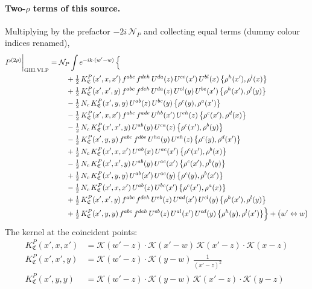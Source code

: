 \documentclass[10pt]{article}
\numberwithin{equation}{section}
\newcommand{\KK}{\mathcal K}
\newcommand{\NP}{\mathcal N_{P}}
\begin{document}
\paragraph{Two-$\rho$ terms of this source.} Multiplying by the prefactor $-2i\,\NP$ and collecting equal terms (dummy colour indices renamed),
\begin{align}
P^{(2\rho)}\bigg|_{\rm GIII.VI.P}={}&\NP\int e^{-ik\cdot(w'-w)}\,\Big\{\notag\\
&\quad +\tfrac12\,K^{P}_{\mathfrak C}(x',x,x')\,f^{abc}\,f^{deh}\,U^{da}(z)\,U^{ce}(x')\,U^{bl}(x)\,\big\{\rho^{h}(x'),\rho^{l}(x)\big\}\notag\\
&\quad +\tfrac12\,K^{P}_{\mathfrak C}(x',x',y)\,f^{abc}\,f^{deh}\,U^{da}(z)\,U^{cl}(y)\,U^{be}(x')\,\big\{\rho^{h}(x'),\rho^{l}(y)\big\}\notag\\
&\quad -\tfrac12\,N_{c}\,K^{P}_{\mathfrak C}(x',y,y)\,U^{ab}(z)\,U^{bc}(y)\,\big\{\rho^{c}(y),\rho^{a}(x')\big\}\notag\\
&\quad -\tfrac12\,K^{P}_{\mathfrak C}(x',x,x')\,f^{abc}\,f^{ade}\,U^{hb}(x')\,U^{eh}(z)\,\big\{\rho^{c}(x'),\rho^{d}(x)\big\}\notag\\
&\quad -\tfrac12\,N_{c}\,K^{P}_{\mathfrak C}(x',x',y)\,U^{ab}(y)\,U^{ca}(z)\,\big\{\rho^{c}(x'),\rho^{b}(y)\big\}\notag\\
&\quad -\tfrac12\,K^{P}_{\mathfrak C}(x',y,y)\,f^{abc}\,f^{dbe}\,U^{ha}(y)\,U^{eh}(z)\,\big\{\rho^{c}(y),\rho^{d}(x')\big\}\notag\\
&\quad +\tfrac12\,N_{c}\,K^{P}_{\mathfrak C}(x',x,x')\,U^{ab}(x)\,U^{ac}(x')\,\big\{\rho^{c}(x'),\rho^{b}(x)\big\}\notag\\
&\quad -\tfrac12\,N_{c}\,K^{P}_{\mathfrak C}(x',x',y)\,U^{ab}(y)\,U^{ac}(x')\,\big\{\rho^{c}(x'),\rho^{b}(y)\big\}\notag\\
&\quad +\tfrac12\,N_{c}\,K^{P}_{\mathfrak C}(x',y,y)\,U^{ab}(x')\,U^{ac}(y)\,\big\{\rho^{c}(y),\rho^{b}(x')\big\}\notag\\
&\quad -\tfrac12\,N_{c}\,K^{P}_{\mathfrak C}(x',x,x')\,U^{ab}(z)\,U^{bc}(x')\,\big\{\rho^{c}(x'),\rho^{a}(x)\big\}\notag\\
&\quad +\tfrac12\,K^{P}_{\mathfrak C}(x',x',y)\,f^{abc}\,f^{deh}\,U^{eb}(z)\,U^{ad}(x')\,U^{cl}(y)\,\big\{\rho^{h}(x'),\rho^{l}(y)\big\}\notag\\
&\quad +\tfrac12\,K^{P}_{\mathfrak C}(x',y,y)\,f^{abc}\,f^{deh}\,U^{eb}(z)\,U^{al}(x')\,U^{cd}(y)\,\big\{\rho^{h}(y),\rho^{l}(x')\big\}\Big\}+\big(w'\leftrightarrow w\big)\label{B:eq:res-GIII.VI.P}
\end{align}
The kernel at the coincident points:
\begin{align*}
K^{P}_{\mathfrak C}(x',x,x')&=\KK(w'-z)\cdot\KK(x'-w)\,\KK(x'-z)\cdot\KK(x-z)\\K^{P}_{\mathfrak C}(x',x',y)&=\KK(w'-z)\cdot\KK(y-w)\,\frac{1}{(x'-z)^2}\\K^{P}_{\mathfrak C}(x',y,y)&=\KK(w'-z)\cdot\KK(y-w)\,\KK(x'-z)\cdot\KK(y-z)
\end{align*}
\end{document}
